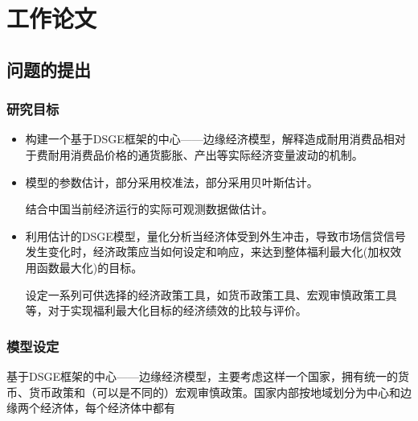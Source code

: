 \chapter{工作论文}
\label{sec:housing}

\section{问题的提出}
\label{sec:housing-intro}

\subsection{研究目标}
\label{sec:housing-goals}
\begin{itemize}
  \item 构建一个基于DSGE框架的中心——边缘经济模型，解释造成耐用消费品相对于费耐用消费品价格的通货膨胀、产出等实际经济变量波动的机制。

  \item 模型的参数估计，部分采用校准法，部分采用贝叶斯估计。

  结合中国当前经济运行的实际可观测数据做估计。

  \item 利用估计的DSGE模型，量化分析当经济体受到外生冲击，导致市场信贷信号发生变化时，经济政策应当如何设定和响应，来达到整体福利最大化(加权效用函数最大化)的目标。

  设定一系列可供选择的经济政策工具，如货币政策工具、宏观审慎政策工具等，对于实现福利最大化目标的经济绩效的比较与评价。
\end{itemize}

\subsection{模型设定}
\label{sec:housing-setup}
基于DSGE框架的中心——边缘经济模型，主要考虑这样一个国家，拥有统一的货币、货币政策和（可以是不同的）宏观审慎政策。国家内部按地域划分为中心和边缘两个经济体，每个经济体中都有

